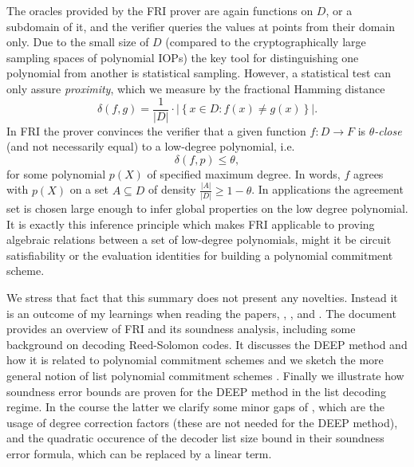 \documentclass[11pt,article,oneside]{memoir}
\theoremstyle{definition}
\theoremstyle{remark}
\begin{document}
The oracles provided by the FRI prover are again functions on $D$, or a subdomain of it, and the verifier queries the values at points from their domain only.
Due to the small size of $D$ (compared to the cryptographically large sampling spaces of polynomial IOPs) the key tool for distinguishing one  polynomial from another is statistical sampling. 
However, a statistical test can only assure \textit{proximity}, which we measure by the fractional Hamming distance
\begin{equation*}
\delta(f, g) = \frac{1}{|D|}\cdot \big|\left\{x\in D: f(x)\neq g(x)\right\}\big|.
\end{equation*}
In FRI the prover convinces the verifier that a given function $f: D\longrightarrow F$ is \textit{$\theta$-close} (and not necessarily equal) to a low-degree polynomial, i.e.
\begin{equation*}
\delta(f, p) \leq \theta,
\end{equation*}
for some polynomial $p(X)$ of specified maximum degree.
In words, $f$ agrees with $p(X)$ on a set $A\subseteq D$ of density $\frac{|A|}{|D|} \geq 1-\theta$. 
In applications the agreement set is chosen large enough to infer global properties on the low degree polynomial. 
It is exactly this inference principle which makes FRI applicable to proving algebraic relations between a set of low-degree polynomials, might it be circuit satisfiability or the evaluation identities for building a polynomial commitment scheme.


We stress that fact that this summary does not present any novelties.
Instead it is an outcome of my learnings when reading the papers\cite{ProximityGaps}, \cite{DEEPFRI}, \cite{FRI}, \cite{Redshift} and \cite{ethSTARK}. 
The document provides an overview of FRI and its soundness analysis, including some background on decoding Reed-Solomon codes.
It discusses the DEEP method and how it is related to polynomial commitment schemes and we sketch the more general notion of list polynomial commitment schemes \cite{Redshift}. 
Finally we illustrate how soundness error bounds are proven for the DEEP method in the list decoding regime. 
In the course the latter we clarify some minor gaps of \cite{ethSTARK}, which are the usage of degree correction factors (these are not needed for the DEEP method), and the quadratic occurence of the decoder list size bound in their soundness error formula, which can be replaced by a linear term.   
\end{document}
